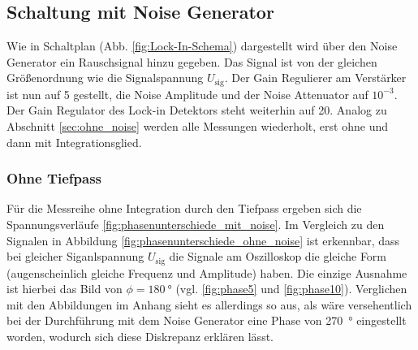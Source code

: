\subsection{Schaltung mit Noise Generator}
\label{sec:mit_noise}
Wie in Schaltplan (Abb. \ref{fig:Lock-In-Schema}) dargestellt wird über den Noise Generator ein Rauschsignal hinzu gegeben.
Das Signal ist von der gleichen Größenordnung wie die Signalspannung $U_\text{sig}$.
Der Gain Regulierer am Verstärker ist nun auf 5 gestellt, die Noise Amplitude und der Noise Attenuator auf $10^{-3}$.
Der Gain Regulator des Lock-in Detektors steht weiterhin auf 20.
Analog zu Abschnitt \ref{sec:ohne_noise} werden alle Messungen wiederholt, erst ohne und dann mit Integrationsglied.


\subsubsection{Ohne Tiefpass}
\label{sec:mit_noise_ohne_tp}
Für die Messreihe ohne Integration durch den Tiefpass ergeben sich die Spannungsverläufe \ref{fig:phasenunterschiede_mit_noise}.
Im Vergleich zu den Signalen in Abbildung \ref{fig:phasenunterschiede_ohne_noise} ist erkennbar, dass bei gleicher Siganlspannung $U_\text{sig}$
die Signale am Oszilloskop die gleiche Form (augenscheinlich gleiche Frequenz und Amplitude) haben.
Die einzige Ausnahme ist hierbei das Bild von $\phi = \qty[]{180}{\degree}$ (vgl. \ref{fig:phase5} und \ref{fig:phase10}).
Verglichen mit den Abbildungen im Anhang sieht es allerdings so aus, als wäre versehentlich bei der Durchführung mit dem Noise Generator eine Phase von 
\qty[]{270}{\degree} eingestellt worden, wodurch sich diese Diskrepanz erklären lässt.
%
%

